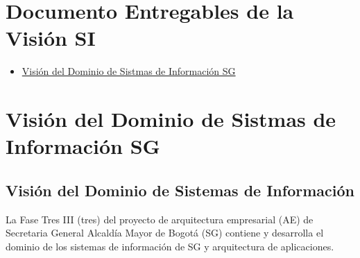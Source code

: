 \documentclass[
	a4paper, %
	12pt, %
]{include/CSSullivanBusinessReport}
\def\tightlist{}
\begin{document}
\newpage

\begin{twothirdswidth} %
	\tableofcontents %
\end{twothirdswidth}

\newpage


\section{Documento Entregables de la Visión
SI}\label{sec:documento-entregables-de-la-visiuxf3n-si}

\begin{itemize}
\tightlist
\item
  \hyperref[visiuxf3n-del-dominio-de-sistmas-de-informaciuxf3n-sg]{Visión
  del Dominio de Sistmas de Información SG}
\end{itemize}

\newpage

\section{Visión del Dominio de Sistmas de Información
SG}\label{sec:visiuxf3n-del-dominio-de-sistmas-de-informaciuxf3n-sg}

\subsection{Visión del Dominio de Sistemas de
Información}\label{sec:visiuxf3n-del-dominio-de-sistemas-de-informaciuxf3n}

\begin{quote}
\end{quote}

La Fase Tres III (tres) del proyecto de arquitectura empresarial (AE) de
Secretaria General Alcaldía Mayor de Bogotá (SG) contiene y desarrolla
el dominio de los sistemas de información de SG y arquitectura de
aplicaciones.
\end{document}
